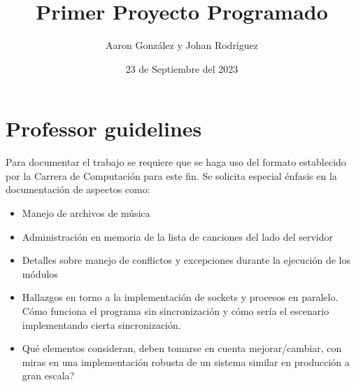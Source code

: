\documentclass{lib/preamble}
\begin{document}

\title{Primer Proyecto Programado}
\author{Aaron González y Johan Rodríguez}
\date{23 de Septiembre del 2023}

\maketitle

\section{Professor guidelines}

Para documentar el trabajo se requiere que se haga uso del formato establecido
por la Carrera de Computación para este fin. Se solicita especial énfasis en la
documentación de aspectos como:

\begin{itemize}
    \item Manejo de archivos de música
    \item Administración en memoria de la lista de canciones del lado del
    servidor
    \item Detalles sobre manejo de conflictos y excepciones durante la ejecución
    de los módulos
    \item Hallazgos en torno a la implementación de sockets y procesos en
    paralelo. Cómo funciona el programa sin sincronización y cómo sería el
    escenario implementando cierta sincronización.
    \item Qué elementos consideran, deben tomarse en cuenta mejorar/cambiar, con
    miras en una implementación robusta de un sistema similar en producción a
    gran escala?
\end{itemize}





\end{document}
